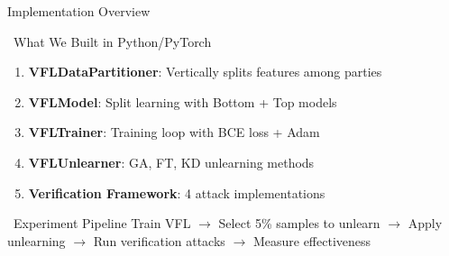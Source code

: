 \documentclass[aspectratio=169, 11pt]{beamer}
\begin{document}
\begin{frame}{Implementation Overview}
    \begin{block}{\faCode\ What We Built in Python/PyTorch}
        \begin{enumerate}
            \item \textbf{VFLDataPartitioner}: Vertically splits features among parties
            \item \textbf{VFLModel}: Split learning with Bottom + Top models
            \item \textbf{VFLTrainer}: Training loop with BCE loss + Adam
            \item \textbf{VFLUnlearner}: GA, FT, KD unlearning methods
            \item \textbf{Verification Framework}: 4 attack implementations
        \end{enumerate}
    \end{block}
    
    \vspace{0.5em}
    \begin{exampleblock}{\faFlask\ Experiment Pipeline}
        Train VFL $\rightarrow$ Select 5\% samples to unlearn $\rightarrow$ Apply unlearning $\rightarrow$ Run verification attacks $\rightarrow$ Measure effectiveness
    \end{exampleblock}
\end{frame}
\end{document}
